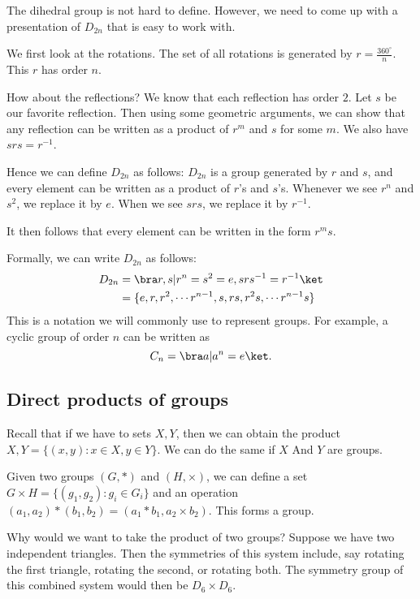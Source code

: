 \documentclass[a4paper]{article}
\begin{document}
The dihedral group is not hard to define. However, we need to come up with a presentation of $D_{2n}$ that is easy to work with.

We first look at the rotations. The set of all rotations is generated by $r = \frac{360^\circ}{n}$. This $r$ has order $n$.

How about the reflections? We know that each reflection has order $2$. Let $s$ be our favorite reflection. Then using some geometric arguments, we can show that any reflection can be written as a product of $r^m$ and $s$ for some $m$. We also have $srs = r^{-1}$.

Hence we can define $D_{2n}$ as follows: $D_{2n}$ is a group generated by $r$ and $s$, and every element can be written as a product of $r$'s and $s$'s. Whenever we see $r^n$ and $s^2$, we replace it by $e$. When we see $srs$, we replace it by $r^{-1}$.

It then follows that every element can be written in the form $r^m s$.

Formally, we can write $D_{2n}$ as follows:
\begin{align*}
  D_{2n} &= \bra r, s|r^n=s^2=e, srs^{-1} = r^{-1}\ket\\
  &= \{e, r, r^2, \cdots r^{n-1}, s, rs, r^2s, \cdots r^{n-1}s\}
\end{align*}
This is a notation we will commonly use to represent groups. For example, a cyclic group of order $n$ can be written as
\[
  C_n = \bra a| a^n =e \ket.
\]

\subsection{Direct products of groups}
Recall that if we have to sets $X, Y$, then we can obtain the product $X, Y = \{(x, y): x\in X, y\in Y\}$. We can do the same if $X$ And $Y$ are groups.

\begin{defi}
  Given two groups $(G, *)$ and $(H, \times)$, we can define a set $G\times H = \{(g_1, g_2): g_i\in G_i\}$ and an operation $(a_1, a_2)*(b_1, b_2) = (a_1*b_1, a_2\times b_2)$. This forms a group.
\end{defi}

Why would we want to take the product of two groups? Suppose we have two independent triangles. Then the symmetries of this system include, say rotating the first triangle, rotating the second, or rotating both. The symmetry group of this combined system would then be $D_6 \times D_6$.
\end{document}
